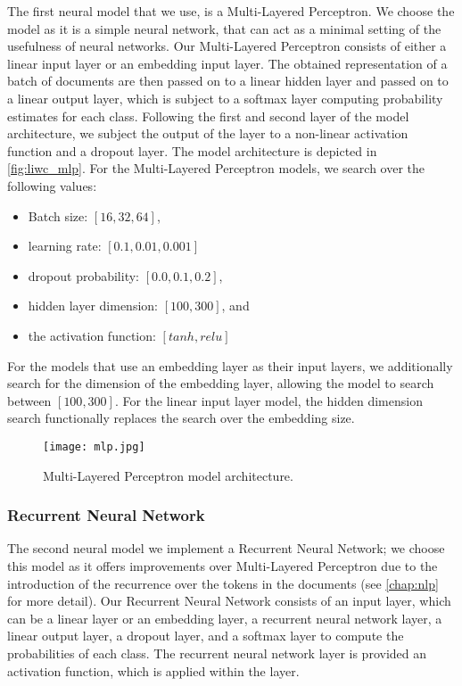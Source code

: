 The first neural model that we use, is a Multi-Layered Perceptron. We choose the model as it is a simple neural network, that can act as a minimal setting of the usefulness of neural networks. Our Multi-Layered Perceptron consists of either a linear input layer or an embedding input layer. The obtained representation of a batch of documents are then passed on to a linear hidden layer and passed on to a linear output layer, which is subject to a softmax layer computing probability estimates for each class. Following the first and second layer of the model architecture, we subject the output of the layer to a non-linear activation function and a dropout layer. The model architecture is depicted in \autoref{fig:liwc_mlp}. For the Multi-Layered Perceptron models, we search over the following values:

\begin{itemize}
  \item Batch size: $[16, 32, 64]$,
  \item learning rate: $[0.1, 0.01, 0.001]$
  \item dropout probability: $[0.0, 0.1, 0.2]$,
  \item hidden layer dimension: $[100, 300]$, and
  \item the activation function: $[tanh, relu]$
\end{itemize}

For the models that use an embedding layer as their input layers, we additionally search for the dimension of the embedding layer, allowing the model to search between $[100, 300]$. For the linear input layer model, the hidden dimension search functionally replaces the search over the embedding size.

\begin{figure}
  \centering
  \texttt{[image: mlp.jpg]}
  \caption{Multi-Layered Perceptron model architecture.}
  \label{fig:liwc_mlp}
\end{figure}


\subsubsection{Recurrent Neural Network}

The second neural model we implement a Recurrent Neural Network; we choose this model as it offers improvements over Multi-Layered Perceptron due to the introduction of the recurrence over the tokens in the documents (see \autoref{chap:nlp} for more detail). Our Recurrent Neural Network consists of an input layer, which can be a linear layer or an embedding layer, a recurrent neural network layer, a linear output layer, a dropout layer, and a softmax layer to compute the probabilities of each class. The recurrent neural network layer is provided an activation function, which is applied within the layer. 

